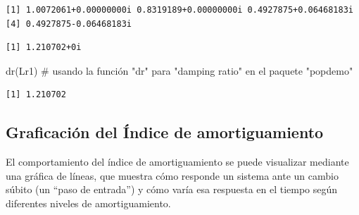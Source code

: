 \documentclass[
  12pt,
  letterpaper,
]{book}
\newenvironment{Shaded}{\begin{snugshade}}{\end{snugshade}}
\newcommand{\CommentTok}[1]{\textcolor[rgb]{0.37,0.37,0.37}{#1}}
\newcommand{\DecValTok}[1]{\textcolor[rgb]{0.68,0.00,0.00}{#1}}
\newcommand{\FunctionTok}[1]{\textcolor[rgb]{0.28,0.35,0.67}{#1}}
\newcommand{\NormalTok}[1]{\textcolor[rgb]{0.00,0.23,0.31}{#1}}
\newcommand{\OtherTok}[1]{\textcolor[rgb]{0.00,0.23,0.31}{#1}}
\newcommand{\SpecialCharTok}[1]{\textcolor[rgb]{0.37,0.37,0.37}{#1}}
\begin{document}
\begin{Shaded}
\end{Shaded}

\begin{verbatim}
[1] 1.0072061+0.00000000i 0.8319189+0.00000000i 0.4927875+0.06468183i
[4] 0.4927875-0.06468183i
\end{verbatim}

\begin{Shaded}
\end{Shaded}

\begin{verbatim}
[1] 1.210702+0i
\end{verbatim}

\begin{Shaded}
\begin{Highlighting}[]
\FunctionTok{dr}\NormalTok{(Lr1) }\CommentTok{\# usando la función "dr" para "damping ratio" en el paquete "popdemo"}
\end{Highlighting}
\end{Shaded}

\begin{verbatim}
[1] 1.210702
\end{verbatim}

\subsection{Graficación del Índice de
amortiguamiento}\label{graficaciuxf3n-del-uxedndice-de-amortiguamiento}

El comportamiento del índice de amortiguamiento se puede visualizar
mediante una gráfica de líneas, que muestra cómo responde un sistema
ante un cambio súbito (un ``paso de entrada'') y cómo varía esa
respuesta en el tiempo según diferentes niveles de amortiguamiento.
\end{document}
